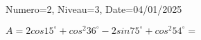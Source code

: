 \documentclass[a4paper,12pt]{article}
\begin{document}
\begin{Maquette}[DS]{Numero=2, Niveau=3, Date=04/01/2025}
\begin{exercice}[BaremeDetaille]
\begin{enumerate}
$A=2cos15^{\circ}+cos^{2}36^{\circ}-2sin75^{\circ}+cos^{2}54^{\circ}=$\anserline[10]

%
%
\end{enumerate}
\end{exercice}
\end{Maquette}
\end{document}
